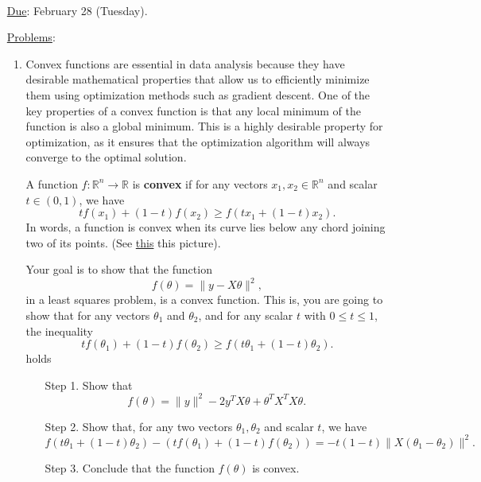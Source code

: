 \documentclass{article}
\begin{document}
\\


\bigskip

\begin{itemize}
\item[\underline{Due}:] February 28 (Tuesday).
\item[\underline{Problems}:]
\begin{enumerate}
\item
Convex functions are essential in data analysis because they have desirable mathematical properties that allow us to efficiently minimize them using optimization methods such as gradient descent. 
One of the key properties of a convex function is that any local minimum of the function is also a global minimum.
This is a highly desirable property for optimization, as it ensures that the optimization algorithm will always converge to the optimal solution.

\bigskip

A function $f:\mathbb{R}^n \rightarrow \mathbb{R}$ is \textbf{convex} if for any vectors $x_1,x_2\in\mathbb{R}^n$ and scalar $t\in (0,1)$, we have
\[
t f(x_1) + (1-t)f(x_2) \geq f(tx_1+(1-t)x_2).
\]
In words, a function is convex when its curve lies below any chord joining two of its points.
(See \href{https://en.wikipedia.org/wiki/Convex_function#/media/File:ConvexFunction.svg}{this} this picture).

\bigskip

Your goal is to show that the function
\[
f(\theta) = \| y- X\theta\|^2,
\]
in a least squares problem, is a convex function.
This is, you are going to show that for any vectors $\theta_1$ and $\theta_2$, and for any scalar $t$ with $0 \leq t \leq 1$, the inequality
\[
t f(\theta_1) + (1-t)f(\theta_2) \geq f(t\theta_1+(1-t)\theta_2).
\]
holds
\medskip

\begin{enumerate}
\item[Step 1.] Show that
\[
f(\theta) = \|y\|^2 - 2y^TX\theta + \theta^TX^TX\theta.
\]
\item[Step 2.] Show that, for any two vectors $\theta_1,\theta_2$ and scalar $t$, we have
\[
f(t\theta_1 + (1-t)\theta_2) - 
\left( t f(\theta_1)+(1-t)f(\theta_2)\right) =
 -t(1-t)\|X(\theta_1-\theta_2)\|^2.
\]
\item[Step 3.] Conclude that the function $f(\theta)$ is convex.
\end{enumerate}

\bigskip


\end{enumerate}
\end{itemize}
\end{document}
